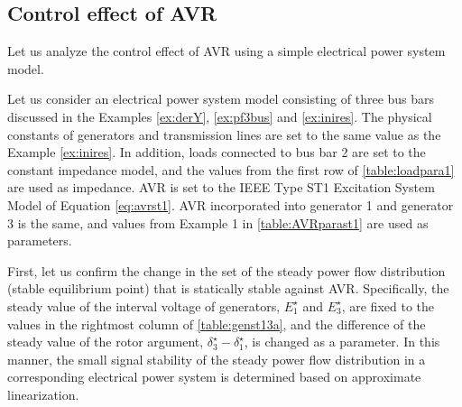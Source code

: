 \documentclass[tombow,dvipdfmx]{corona-a5-1.1}
\begin{document}
\subsection{Control effect of AVR}

Let us analyze the control effect of AVR using a simple electrical power system model.

\begin{例}[自動電圧調整器による定態安定性と過渡安定度の変化]\label{ex:avreffect}
Let us consider an electrical power system model consisting of three bus bars discussed in the Examples \ref{ex:derY}, \ref{ex:pf3bus} and \ref{ex:inires}.
The physical constants of generators and transmission lines are set to the same value as the Example \ref{ex:inires}.
In addition, loads connected to bus bar 2 are set to the constant impedance model, and the values from the first row of \ref{table:loadpara1} are used as impedance.
AVR is set to the IEEE Type ST1 Excitation System Model of Equation \ref{eq:avrst1}. AVR incorporated into generator 1 and generator 3 is the same, and values from Example 1 in \ref{table:AVRparast1} are used as parameters.

First, let us confirm the change in the set of the steady power flow distribution (stable equilibrium point) that is statically stable against AVR.
Specifically, the steady value of the interval voltage of generators, $E_1^{\star}$ and $E_3^{\star}$, are fixed to the values in the rightmost column of \ref{table:genst13a}, and the difference of the steady value of the rotor argument, $\delta_3^{\star}-\delta_1^{\star}$, is changed as a parameter.
In this manner, the small signal stability of the steady power flow distribution in a corresponding electrical power system is determined based on approximate linearization.


\end{例}
\end{document}
